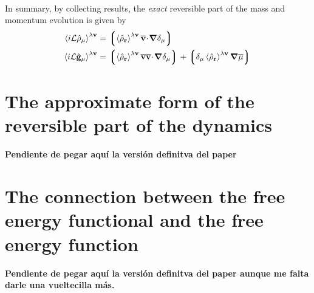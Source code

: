 \documentclass[b5paper,openright,11pt]{book}
\newcommand{\esc}{\!\cdot\!}
\newcommand{\Note}[1]{{\bf \color{red}#1}}    %
\newcommand{\llangle}{\left\langle}
\newcommand{\rrangle}{\right\rangle}
\newcommand{\llg}{\left\lgroup}
\newcommand{\rlg}{\right\rgroup}
\begin{document}
\begin{appendices}
\begin{align}
\label{mufield}
\end{align}
In summary, by collecting results, the \textit{exact} reversible part of the mass and
momentum evolution is given by
\begin{align}
  \llangle i{\cal L}\hat{\rho}_\mu\rrangle^{\lambda{\bf v}} &=
  \llg\llangle \hat{\rho}_{\bf r}\rrangle^{\lambda{\bf v}}
\overline{\bf v}\esc\boldsymbol{\nabla}\delta_{\mu}\rlg
\nonumber\\
  \llangle i{\cal L}\hat{\bf g}_\mu\rrangle^{\lambda{\bf v}} &=
\llg\llangle \hat{\rho}_{\bf r}\rrangle^{\lambda{\bf v}}
\overline{\bf v}\overline{\bf v}\esc\boldsymbol{\nabla}\delta_{\mu}\rlg
+\llg\delta_\mu\llangle\hat{\rho}_{\bf r}\rrangle^{\lambda{\bf v}}\boldsymbol{\nabla}\overline{\mu}\rlg
\label{RevExact}
\end{align}


\section{The approximate form of the reversible part of the dynamics}
\Note{Pendiente de pegar aquí la versión definitva del paper}
\section{The connection between the  free energy functional and the
  free energy function}
\Note{Pendiente de pegar aquí la versión definitva del paper aunque me falta darle una vueltecilla más.}





\end{appendices}
\end{document}
